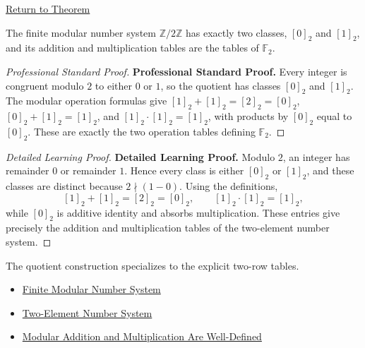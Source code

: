 \newpage
{}
\label{prf:z-mod-two-is-two-element-system}

\begin{remark*}[Return]
\hyperref[thm:z-mod-two-is-two-element-system]{Return to Theorem}
\end{remark*}

\begin{theorem*}
The finite modular number system \(\mathbb{Z}/2\mathbb{Z}\) has exactly two
classes, \([0]_2\) and \([1]_2\), and its addition and multiplication tables
are the tables of \(\mathbb{F}_2\).
\end{theorem*}

\begin{proof}[Professional Standard Proof]
\LRAProofBodyStart
\textbf{Professional Standard Proof.}
Every integer is congruent modulo \(2\) to either \(0\) or \(1\), so the
quotient has classes \([0]_2\) and \([1]_2\). The modular operation formulas
give \([1]_2+[1]_2=[2]_2=[0]_2\), \([0]_2+[1]_2=[1]_2\), and
\([1]_2\cdot[1]_2=[1]_2\), with products by \([0]_2\) equal to \([0]_2\).
These are exactly the two operation tables defining \(\mathbb{F}_2\).
\end{proof}

\begin{proof}[Detailed Learning Proof]
\LRAProofBodyStart
\textbf{Detailed Learning Proof.}
Modulo \(2\), an integer has remainder \(0\) or remainder \(1\). Hence every
class is either \([0]_2\) or \([1]_2\), and these classes are distinct because
\(2\nmid(1-0)\). Using the definitions,
\[
[1]_2+[1]_2=[2]_2=[0]_2,
\qquad
[1]_2\cdot[1]_2=[1]_2,
\]
while \([0]_2\) is additive identity and absorbs multiplication. These entries
give precisely the addition and multiplication tables of the two-element
number system.
\end{proof}

\begin{remark*}
The quotient construction specializes to the explicit two-row tables.
\end{remark*}

\begin{dependencies}
\begin{itemize}
  \item \hyperref[def:finite-modular-number-system]{Finite Modular Number System}
  \item \hyperref[def:two-element-number-system]{Two-Element Number System}
  \item \hyperref[thm:modular-operations-well-defined]{Modular Addition and Multiplication Are Well-Defined}
\end{itemize}
\end{dependencies}

\clearpage
